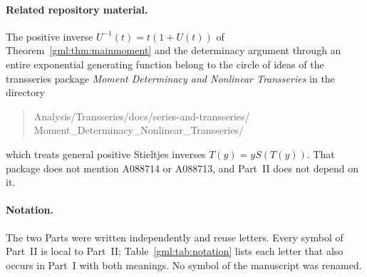 \documentclass[11pt]{article}
\numberwithin{equation}{section}
\theoremstyle{definition}
\theoremstyle{remark}
\begin{document}
\paragraph{Related repository material.}
The positive inverse $U^{-1}(t)=t(1+U(t))$ of
Theorem~\ref{gml:thm:mainmoment} and the determinacy argument through an
entire exponential generating function belong to the circle of ideas of
the transseries package \emph{Moment Determinacy and Nonlinear Transseries}
in the directory
\begin{quote}\small\ttfamily
Analysis/Transseries/docs/series-and-transseries/\\
Moment\_Determinacy\_Nonlinear\_Transseries/
\end{quote}
which treats general positive Stieltjes inverses $T(y)=yS(T(y))$. That package does not
mention A088714 or A088713, and Part~II does not depend on it.

\paragraph{Notation.}
The two Parts were written independently and reuse letters. Every symbol
of Part~II is local to Part~II; Table~\ref{gml:tab:notation} lists each
letter that also occurs in Part~I with both meanings. No symbol of the
manuscript was renamed.
\end{document}

